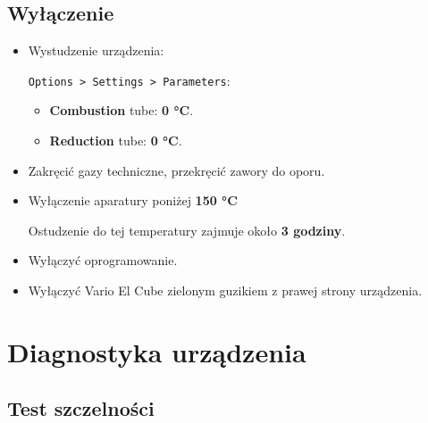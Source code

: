 \documentclass[
  letterpaper,
  DIV=11,
  numbers=noendperiod]{scrreprt}
\begin{document}
\hypertarget{wyux142ux105czenie}{%
\subsection{Wyłączenie}\label{wyux142ux105czenie}}

\begin{itemize}
\item
  Wystudzenie urządzenia:

  \texttt{Options\ \textgreater{}\ Settings\ \textgreater{}\ Parameters}:

  \begin{itemize}
  \item
    \textbf{Combustion} tube: \textbf{0 °C}.
  \item
    \textbf{Reduction} tube: \textbf{0 °C}.
  \end{itemize}
\item
  Zakręcić gazy techniczne, przekręcić zawory do oporu.
\item
  Wyłączenie aparatury poniżej \textbf{150 °C}

  Ostudzenie do tej temperatury zajmuje około \textbf{3 godziny}.
\item
  Wyłączyć oprogramowanie.
\item
  Wyłączyć Vario El Cube zielonym guzikiem z prawej strony urządzenia.
\end{itemize}

\hypertarget{diagnostyka-urzux105dzenia}{%
\section{Diagnostyka urządzenia}\label{diagnostyka-urzux105dzenia}}

\hypertarget{test-szczelnoux15bci}{%
\subsection{Test szczelności}\label{test-szczelnoux15bci}}
\end{document}
